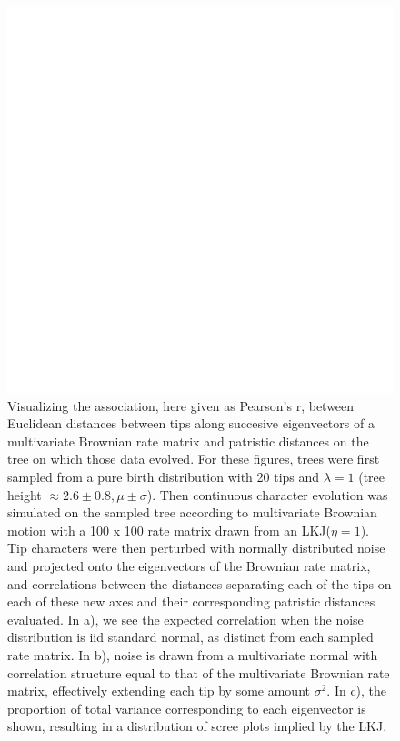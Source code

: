 \begin{figure}[h]
\centering
\includegraphics[width=160mm]{figures/noisydecay_of_association.pdf}
\caption[Association Between Euclidean Distances Along Eigenvectors and Patristic Distances]{Visualizing the association, here given as Pearson's r, between Euclidean distances between tips along succesive eigenvectors of a multivariate Brownian rate matrix and patristic distances on the tree on which those data evolved. For these figures, trees were first sampled from a pure birth distribution with 20 tips and $\lambda = 1$ (tree height $\approx 2.6 \pm 0.8, \mu \pm \sigma$). Then continuous character evolution was simulated on the sampled tree according to multivariate Brownian motion with a 100 x 100 rate matrix drawn from an LKJ($\eta = 1$). Tip characters were then perturbed with normally distributed noise and projected onto the eigenvectors of the Brownian rate matrix, and correlations between the distances separating each of the tips on each of these new axes and their corresponding patristic distances evaluated. In a), we see the expected correlation when the noise distribution is iid standard normal, as distinct from each sampled rate matrix. In b), noise is drawn from a multivariate normal with correlation structure equal to that of the multivariate Brownian rate matrix, effectively extending each tip by some amount $\sigma^2$. In c), the proportion of total variance corresponding to each eigenvector is shown, resulting in a distribution of scree plots implied by the LKJ.
\label{fig:noisyEigenvalues}
\label{overflow}}
\end{figure}

